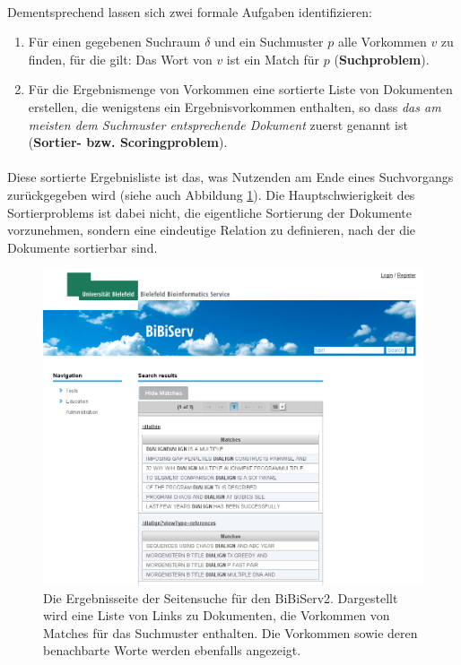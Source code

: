 \paragraph{} Dementsprechend lassen sich zwei formale Aufgaben identifizieren:
\begin{enumerate}
 \item Für einen gegebenen Suchraum $\delta$ und ein Suchmuster $p$ alle Vorkommen $v$ zu finden, für die gilt: Das Wort von $v$ ist ein Match für $p$ (\textbf{Suchproblem}).
 \item Für die Ergebnismenge von Vorkommen eine sortierte Liste von Dokumenten erstellen, die wenigstens ein Ergebnisvorkommen enthalten, so dass \textit{das am meisten dem Suchmuster entsprechende Dokument} zuerst genannt ist (\textbf{Sortier- bzw. Scoringproblem}).
\end{enumerate}
 
\paragraph{} Diese sortierte Ergebnisliste ist das, was Nutzenden am Ende eines Suchvorgangs zurückgegeben wird (siehe auch Abbildung \ref{fig-matches-screenshot}). Die Hauptschwierigkeit des Sortierproblems ist dabei nicht, die eigentliche Sortierung der Dokumente vorzunehmen, sondern eine eindeutige Relation zu definieren, nach der die Dokumente sortierbar sind.

\begin{figure}
\includegraphics[scale=0.35]{resources/matches_screenshot.png}
\caption{Die Ergebnisseite der Seitensuche für den BiBiServ2. Dargestellt wird eine Liste von Links zu Dokumenten, die Vorkommen von Matches für das Suchmuster enthalten. Die Vorkommen sowie deren benachbarte Worte werden ebenfalls angezeigt.}
\label{fig-matches-screenshot}
\end{figure}

